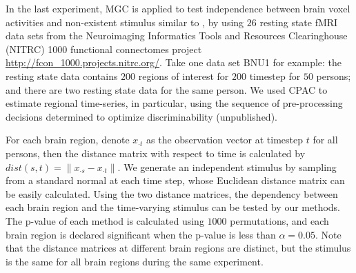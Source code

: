 \documentclass[11pt]{article}
\begin{document}
In the last experiment, MGC is applied to test independence between brain voxel activities and non-existent stimulus similar to \cite{EklundKnutsson2012}, by using $26$ resting state fMRI data sets from the Neuroimaging Informatics Tools and Resources Clearinghouse (NITRC) 1000 functional connectomes project \url{http://fcon_1000.projects.nitrc.org/}. Take one data set BNU1 for example: the resting state data contains $200$ regions of interest for $200$ timestep for $50$ persons; and there are two resting state data for the same person. We used CPAC to estimate regional time-series, in particular, using the sequence of pre-processing decisions determined to optimize discriminability (unpublished).

For each brain region, denote $x_{\cdot t}$ as the observation vector at timestep $t$ for all persons, then the distance matrix with respect to time is calculated by $dist(s,t)=\|x_{\cdot s}-x_{\cdot t}\|$. We generate an independent stimulus by sampling from a standard normal at each time step, whose Euclidean distance matrix can be easily calculated. Using the two distance matrices, the dependency between each brain region and the time-varying stimulus can be tested by our methods. The p-value of each method is calculated using $1000$ permutations, and each brain region is declared significant when the p-value is less than $\alpha=0.05$. Note that the distance matrices at different brain regions are distinct, but the stimulus is the same for all brain regions during the same experiment.
\end{document}
